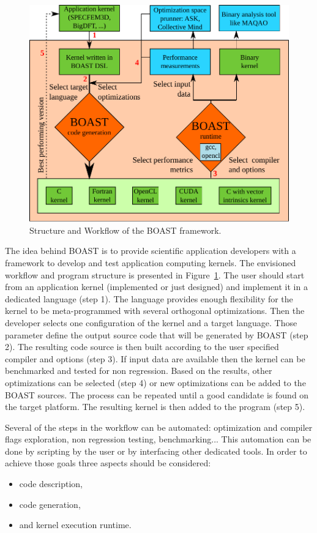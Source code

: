 \documentclass[11pt, a4paper, twoside]{montblanc}
\begin{document}
\begin{figure}
\begin{center}
\includegraphics[width=\textwidth]{BOAST_Workflow.pdf}
\caption{Structure and Workflow of the BOAST framework.}
\label{fig:boast_workflow}
\end{center}
\end{figure}

  The idea behind BOAST is to provide scientific application developers with a
framework to develop and test application computing kernels. The envisioned
workflow and program structure is presented in Figure~\ref{fig:boast_workflow}.
The user should start from an application kernel (implemented or just designed)
and implement it in a dedicated language (step 1). The language provides enough
flexibility for the kernel to be meta-programmed with several orthogonal
optimizations. Then the developer selects one configuration of the kernel and a
target language. Those parameter define the output source code that will be
generated by BOAST (step 2). The resulting code source is then built according to
the user specified compiler and options (step 3). If input data are available
then the kernel can be benchmarked and tested for non regression. Based on the
results, other optimizations can be selected (step 4) or new optimizations can
be added to the BOAST sources. The process can be repeated until a good
candidate is found on the target platform. The resulting kernel is then added to
the program (step 5).

Several of the steps in the workflow can be automated: optimization and compiler
flags exploration, non regression testing, benchmarking... This automation can
be done by scripting by the user or by interfacing other dedicated tools. In
order to achieve those goals three aspects should be considered:
\begin{itemize}
\item code description,
\item code generation,
\item and kernel execution runtime.
\end{itemize}
\end{document}
